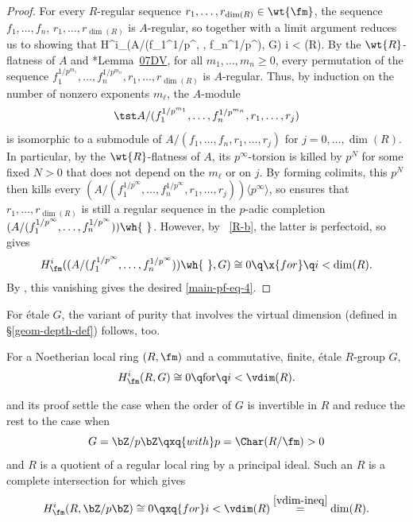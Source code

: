 \begin{proof}
For every $R$-regular sequence $r_1, \dotsc, r_{\dim(R)} \in \wt{\fm}$, the sequence $f_1, \dotsc, f_n$, $r_1, \dotsc, r_{\dim(R)}$ is $A$-regular, so  together with a limit argument reduces us to showing that
\be \label{main-pf-eq-4}
H^i_\fm(A/(f_1^{1/p^\infty}, \dotsc, f_n^{1/p^\infty}), G)  \q {} \q i < \dim(R).
\ee
By the $\wt{R}$-flatness of $A$ and \cite{SP}*{Lemma~\href{https://stacks.math.columbia.edu/tag/07DV}{07DV}}, for all $m_1, \dotsc, m_n \ge 0$, every permutation of the sequence $f_1^{1/p^{m_1}}, \dotsc, f_n^{1/p^{m_n}}, r_1, \dotsc, r_{\dim(R)}$ is $A$-regular. Thus, by induction on the number of nonzero exponents $m_\ell$, the $A$-module
\[
\tst A/(f_1^{1/p^{m_1}}, \dotsc, f_n^{1/p^{m_n}}, r_1, \dotsc, r_{j})
\]
is isomorphic to a submodule of $A/(f_1, \dotsc, f_n, r_1, \dotsc, r_j)$ for $j = 0, \dotsc, \dim(R)$. In particular, by the $\wt{R}$-flatness of $A$, its $p^\infty$-torsion is killed by $p^N$ for some fixed $N > 0$ that does not depend on the $m_\ell$ or on $j$. By forming colimits, this $p^N$ then kills every $(A/(f_1^{1/p^\infty}, \dotsc, f_n^{1/p^\infty}, r_1, \dotsc, r_j))\langle p^\infty\rangle$, so  ensures that $r_1, \dotsc, r_{\dim(R)}$ is still a regular sequence in the $p$-adic completion $(A/(f_1^{1/p^\infty}, \dotsc, f_n^{1/p^\infty}))\wh{\ }$. However, by ~\ref{R-b}, the latter is perfectoid, so  gives
\[
H^i_\fm((A/(f_1^{1/p^\infty}, \dotsc, f_n^{1/p^\infty}))\wh{\ }, G) \cong 0 \q \x{for} \q i < \dim(R).
\]
By , %
this vanishing gives the desired \eqref{main-pf-eq-4}.
\end{proof}




For \'{e}tale $G$, the variant of purity that involves the virtual dimension (defined in \S\ref{geom-depth-def}) follows, too.


\bthm {}
For a Noetherian local ring $(R, \fm)$ and a commutative, finite, \'{e}tale $R$-group $G$,
\[
H^i_\fm(R, G) \cong 0 \q \text{for} \q i < \vdim(R).
\]
\ethm

\bpf
{} and its proof settle the case when the order of $G$ is invertible in $R$ and reduce the rest to the case when
\[
G = \bZ/p\bZ \qxq{with} p = \Char(R/\fm) > 0
\]
and $R$ is a quotient of a regular local ring by a principal ideal. Such an $R$ is a complete intersection for which  gives
\[
H^i_\fm(R, \bZ/p\bZ) \cong 0 \qxq{for} i < \vdim(R) \overset{\eqref{vdim-ineq}}{=} \dim(R). \qedhere
\]
\epf



